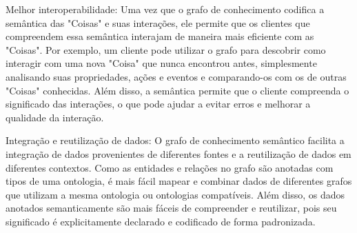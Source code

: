 Melhor interoperabilidade: Uma vez que o grafo de conhecimento codifica a semântica das "Coisas" e suas interações, ele permite que os clientes que compreendem essa semântica interajam de maneira mais eficiente com as "Coisas". Por exemplo, um cliente pode utilizar o grafo para descobrir como interagir com uma nova "Coisa" que nunca encontrou antes, simplesmente analisando suas propriedades, ações e eventos e comparando-os com os de outras "Coisas" conhecidas. Além disso, a semântica permite que o cliente compreenda o significado das interações, o que pode ajudar a evitar erros e melhorar a qualidade da interação.

Integração e reutilização de dados: O grafo de conhecimento semântico facilita a integração de dados provenientes de diferentes fontes e a reutilização de dados em diferentes contextos. Como as entidades e relações no grafo são anotadas com tipos de uma ontologia, é mais fácil mapear e combinar dados de diferentes grafos que utilizam a mesma ontologia ou ontologias compatíveis. Além disso, os dados anotados semanticamente são mais fáceis de compreender e reutilizar, pois seu significado é explicitamente declarado e codificado de forma padronizada.
